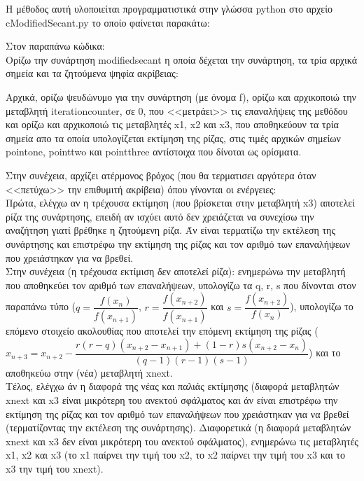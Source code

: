 \documentclass[a4paper,11pt]{article}
\newcommand{\lt}{\latintext}
\newcommand{\gt}{\greektext}
\begin{document}
Η μέθοδος αυτή υλοποιείται προγραμματιστικά στην γλώσσα {\lt python} στο αρχείο {\lt c\textunderscore Modified\textunderscore Secant.py} το οποίο φαίνεται παρακάτω:

\lt

\gt

Στον παραπάνω κώδικα:
\\
Ορίζω την συνάρτηση {\lt modified\textunderscore secant} η οποία δέχεται την συνάρτηση, τα τρία αρχικά σημεία και τα ζητούμενα ψηφία ακρίβειας:\par
Αρχικά, ορίζω ψευδώνυμο για την συνάρτηση (με όνομα {\lt f}), ορίζω και αρχικοποιώ την μεταβλητή {\lt iteration\textunderscore counter}, σε 0,  που <<μετράει>> τις επαναλήψεις της μεθόδου και ορίζω και αρχικοποιώ τις μεταβλητές {\lt x1}, {\lt x2}  και {\lt x3}, που αποθηκεύουν τα τρία σημεία απο τα οποία υπολογίζεται εκτίμηση της ρίζας, στις τιμές αρχικών σημείων {\lt point\textunderscore one}, {\lt point\textunderscore two} και {\lt point\textunderscore three} αντίστοιχα που δίνοται ως ορίσματα.

Στην συνέχεια, αρχίζει ατέρμονος βρόχος (που θα τερματισει αργότερα όταν <<πετύχω>> την επιθυμιτή ακρίβεια) όπου γίνονται οι ενέργειες:\\
Πρώτα, ελέγχω αν η τρέχουσα εκτίμηση (που βρίσκεται στην μεταβλητή {\lt x3}) αποτελεί ρίζα της συνάρτησης, επειδή αν ισχύει αυτό δεν χρειάζεται να συνεχίσω την αναζήτηση γιατί βρέθηκε η ζητούμενη ρίζα. Άν είναι τερματίζω την εκτέλεση της συνάρτησης και επιστρέφω την εκτίμηση της ρίζας και τον αριθμό των επαναλήψεων που χρειάστηκαν για να βρεθεί.\\
Στην συνέχεια (η τρέχουσα εκτίμιση δεν αποτελεί ρίζα): ενημερώνω την μεταβλητή που αποθηκεύει τον αριθμό των επαναλήψεων, υπολογίζω τα {\lt q, r, s} που δίνονται στον παραπάνω τύπο ($q = \dfrac{f(x_n)}{f(x_{n+1})}$, $r = \dfrac{f(x_{n+2})}{f(x_{n+1})}$ {\gt και} $s = \dfrac{f(x_{n+2})}{f(x_n)}$), υπολογίζω το επόμενο στοιχείο ακολουθίας που αποτελεί την επόμενη εκτίμηση της ρίζας ($x_{n+3} = x_{n+2} - \dfrac{r(r-q)(x_{n+2}-x_{n+1}) + (1-r)s(x_{n+2}-x_n)}{(q-1)(r-1)(s-1)}$) και το αποθηκεύω στην (νέα) μεταβλητή {\lt x\textunderscore next}.\\
Τέλος, ελέγχω άν η διαφορά της νέας και παλιάς εκτίμησης (διαφορά μεταβλητών {\lt x\textunderscore next} και {\lt x3} είναι μικρότερη του ανεκτού σφάλματος και άν είναι επιστρέφω την εκτίμηση της ρίζας και τον αριθμό των επαναλήψεων που χρειάστηκαν για να βρεθεί (τερματίζοντας την εκτέλεση της συνάρτησης). 
Διαφορετικά (η διαφορά μεταβλητών {\lt x\textunderscore next} και {\lt x3} δεν είναι μικρότερη του ανεκτού σφάλματος), ενημερώνω τις μεταβλητές {\lt x1}, {\lt x2} και {\lt x3} (το {\lt x1} παίρνει την τιμή του {\lt x2}, το {\lt x2} παίρνει την τιμή του {\lt x3} και το {\lt x3} την τιμή του {\lt x\textunderscore next}).
\end{document}
